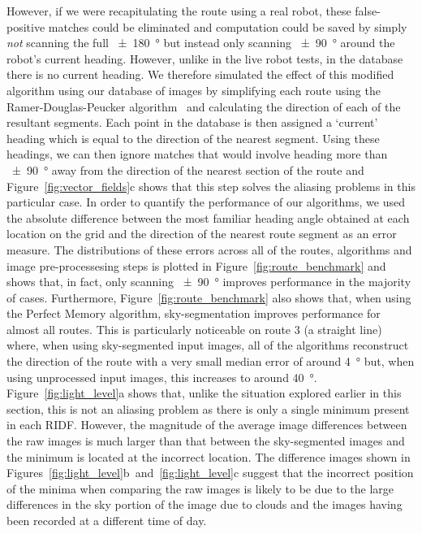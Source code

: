 \documentclass[letterpaper]{article}
\begin{document}
However, if we were recapitulating the route using a real robot, these false-positive matches could be eliminated and computation could be saved by simply \emph{not} scanning the full \SI{\pm 180}{\degree} but instead only scanning \SI{\pm 90}{\degree} around the robot's current heading.
However, unlike in the live robot tests, in the database there is no current heading.
We therefore simulated the effect of this modified algorithm using our database of images by simplifying each route using the Ramer-Douglas-Peucker algorithm~\citep{Ramer1972} and calculating the direction of each of the resultant segments.
Each point in the database is then assigned a `current' heading which is equal to the direction of the nearest segment.
Using these headings, we can then ignore matches that would involve heading more than \SI{\pm 90}{\degree} away from the direction of the nearest section of the route and Figure~\ref{fig:vector_fields}c shows that this step solves the aliasing problems in this particular case.
In order to quantify the performance of our algorithms, we used the absolute difference between the most familiar heading angle obtained at each location on the grid and the direction of the nearest route segment as an error measure.
The distributions of these errors across all of the routes, algorithms and image pre-processesing steps is plotted in Figure~\ref{fig:route_benchmark} and shows that, in fact, only scanning \SI{\pm 90}{\degree} improves performance in the majority of cases.
Furthermore, Figure~\ref{fig:route_benchmark} also shows that, when using the Perfect Memory algorithm, sky-segmentation improves performance for almost all routes.
This is particularly noticeable on route 3 (a straight line) where, when using sky-segmented input images, all of the algorithms reconstruct the direction of the route with a very small median error of around \SI{4}{\degree} but, when using unprocessed input images, this increases to around \SI{40}{\degree}.
Figure~\ref{fig:light_level}a shows that, unlike the situation explored earlier in this section, this is not an aliasing problem as there is only a single minimum present in each RIDF.
However, the magnitude of the average image differences between the raw images is much larger than that between the sky-segmented images and the minimum is located at the incorrect location.
The difference images shown in Figures~\ref{fig:light_level}b~and~\ref{fig:light_level}c suggest that the incorrect position of the minima when comparing the raw images is likely to be due to the large differences in the sky portion of the image due to clouds and the images having been recorded at a different time of day.
\end{document}
